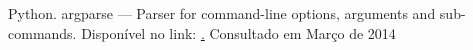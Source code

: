 \documentclass[10pt,journal,cspaper,compsoc]{IEEEtran}
\begin{document}
\begin{thebibliography}{30}
Python. argparse — Parser for command-line options, arguments and sub-commands. Disponível no link: \href{http://docs.python.org/3.4/library/argparse.html}. Consultado em Março de 2014



\end{thebibliography}

% 







\end{document}
